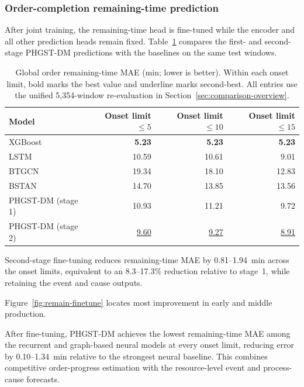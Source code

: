 \documentclass[a4paper,fleqn]{cas-dc}
\begin{document}
\subsubsection{Order-completion remaining-time prediction}\label{sec:comparison-remain}

After joint training, the remaining-time head is fine-tuned while the encoder and all other prediction heads remain fixed. Table~\ref{tab:comparison-remain} compares the first- and second-stage PHGST-DM predictions with the baselines on the same test windows.

\begin{table}[pos=htbp]
\centering
\caption{Global order remaining-time MAE (min; lower is better). Within each onset limit, bold marks the best value and underline marks second-best. All entries use the unified 5,354-window re-evaluation in Section~\ref{sec:comparison-overview}.}
\label{tab:comparison-remain}
\scriptsize
\setlength{\tabcolsep}{3pt}
\renewcommand{\arraystretch}{1.10}
\begin{tabular*}{\columnwidth}{@{\extracolsep{\fill}}lrrr@{}}
\toprule
Model & Onset limit $\leq5$ & Onset limit $\leq10$ & Onset limit $\leq15$ \\
\midrule
XGBoost & \textbf{5.23} & \textbf{5.23} & \textbf{5.23} \\
LSTM & 10.59 & 10.61 & 9.01 \\
BTGCN & 19.34 & 18.10 & 12.83 \\
BSTAN & 14.70 & 13.85 & 13.56 \\
\midrule
PHGST-DM (stage 1) & 10.93 & 11.21 & 9.72 \\
PHGST-DM (stage 2) & \underline{9.60} & \underline{9.27} & \underline{8.91} \\
\bottomrule
\end{tabular*}
\end{table}

Second-stage fine-tuning reduces remaining-time MAE by 0.81--1.94~min across the onset limits, equivalent to an 8.3--17.3\% reduction relative to stage~1, while retaining the event and cause outputs.

Figure~\ref{fig:remain-finetune} locates most improvement in early and middle production.

After fine-tuning, PHGST-DM achieves the lowest remaining-time MAE among the recurrent and graph-based neural models at every onset limit, reducing error by 0.10--1.34~min relative to the strongest neural baseline. This combines competitive order-progress estimation with the resource-level event and process-cause forecasts.
\end{document}
